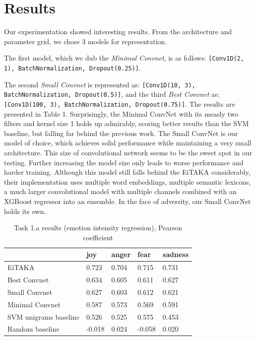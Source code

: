 \documentclass[10pt, a4paper]{article}
\begin{document}
\section{Results}
Our experimentation showed interesting results. 
From the architecture and parameter grid, we chose 3 models for representation.

The first model, which we dub the \textit{Minimal Convnet}, is as follows:
\texttt{[Conv1D(2, 1), BatchNormalization, Dropout(0.25)]}.

The second \textit{Small Convnet} is represented as: 
\texttt{[Conv1D(10, 3), BatchNormalization, Dropout(0.5)]}, and the third 
\textit{Best Convnet} as: 
\texttt{[Conv1D(100, 3), BatchNormalization, Dropout(0.75)]}.
The results are presented in Table 1.
Surprisingly, the Minimal ConvNet with its measly two filters 
and kernel size 1 holds up admirably, scoring
better results than the SVM baseline, but falling far behind the 
previous work.
The Small ConvNet is our model of choice, which achieves solid 
performance while maintaining a very small architecture.
This size of convolutional network seems to be the sweet spot in our testing.
Further increasing the model size only leads to worse performance and 
harder training.
Although this model still falls behind the EiTAKA considerably, their
implementation uses multiple word embeddings, multiple semantic lexicons,
a much larger convolutional model with multiple channels combined with an
XGBoost regressor into an ensemble.
In the face of adversity, our Small ConvNet holds its own.


\begin{table}
\caption{Task 1.a results (emotion intensity regression), Pearson coefficient}
\label{tab:narrow-table}
\begin{center}
\begin{tabular}{lllll}
\toprule
& joy & anger & fear & sadness \\
\midrule
EiTAKA    & 0.723  & 0.704 & 0.715 & 0.731 \\
Best Convnet & 0.634 & 0.605 & 0.611 & 0.627 \\
Small Convnet & 0.627 & 0.603 & 0.612 & 0.621 \\
Minimal Convnet & 0.587 & 0.573 & 0.569 & 0.591 \\
SVM unigrams baseline & 0.526 & 0.525 & 0.575 & 0.453 \\
Random baseline & -0.018 & 0.024 & -0.058 & 0.020 \\
\bottomrule
\end{tabular}
\end{center}
\end{table}
\end{document}
